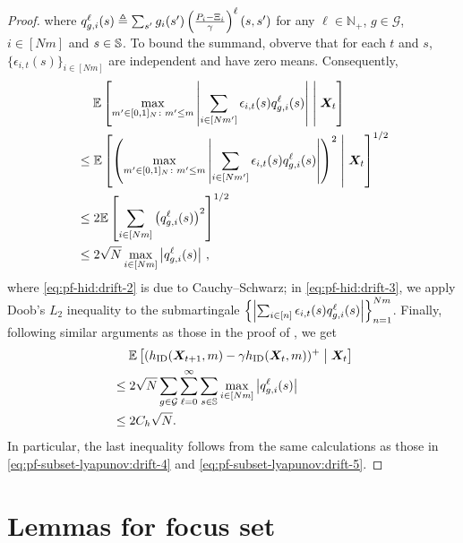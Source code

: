 \begin{proof}
    where $q_{g,i}^{\ell}(s)\triangleq \sum_{s'}g_i(s')\left(\frac{P_i-\Xi_i}{\gamma}\right)^{\ell}(s,s')$ for any $\ell\in \mathbb{N}_{+}$, $g\in \mathcal{G}$, $i\in[Nm]$ and $s\in\mathbb{S}$. 
    To bound the summand, obverve that for each $t$ and $s$, $\{\epsilon_{i,t}(s)\}_{i\in[Nm]}$ are independent and have zero means. 
    Consequently,  
    \begin{align}
        \nonumber
        &\mspace{23mu} \mathbb{E}\left[\max_{m'\in[0,1]_N\colon m'\leq m}\left\lvert\sum_{i\in[Nm']}\epsilon_{i,t}(s)q_{g,i}^{\ell}(s)\right\rvert\;\middle|\;{\bm{X}}_t\right]\\
        \label{eq:pf-hid:drift-2}
        &\leq \mathbb{E}\left[\left(\max_{m'\in[0,1]_N\colon m'\leq m}\left\lvert\sum_{i\in[Nm']}\epsilon_{i,t}(s)q_{g,i}^{\ell}(s)\right\rvert\right)^2\;\middle|\;{\bm{X}}_t\right]^{1/2}\\
        \label{eq:pf-hid:drift-3}
        &\leq 2\mathbb{E}\left[\sum_{i\in[Nm]}\left(q_{g,i}^{\ell}(s)\right)^2\right]^{1/2}\\
        \nonumber
        &\leq 2\sqrt{N}\max_{i\in [Nm]} \left\lvert q_{g,i}^{\ell}(s)\right\rvert\,,
    \end{align}
    where \eqref{eq:pf-hid:drift-2} is due to Cauchy–Schwarz; in \eqref{eq:pf-hid:drift-3}, we apply Doob's $L_2$ inequality to the submartingale $\left\{ \left\lvert\sum_{i\in[n]}\epsilon_{i,t}(s)q_{g,i}^{\ell}(s)\right\rvert \right\}_{n=1}^{Nm}$.  
    Finally, following similar arguments as those in the proof of , we get
    \begin{align*}
        &\mspace{23mu}\mathbb{E}\left[(h_{\textnormal{ID}}({\bm{X}}_{t+1},m)-\gamma h_{\textnormal{ID}}({\bm{X}}_{t},m))^+\;\middle|\;{\bm{X}}_t\right]\\
        &\leq 2\sqrt{N}\sum_{g\in \mathcal{G}}\sum_{\ell=0}^{\infty}\sum_{s\in\mathbb{S}} \max_{i\in[Nm]}\left\lvert q_{g,i}^{\ell}(s)\right\rvert\\
        &\leq2C_h\sqrt{N}. 
    \end{align*}
    In particular, the last inequality follows from the same calculations as those in \eqref{eq:pf-subset-lyapunov:drift-4} and \eqref{eq:pf-subset-lyapunov:drift-5}. 
\end{proof}





\section{Lemmas for focus set}
\label{sec:lem-proof-focus-set}

